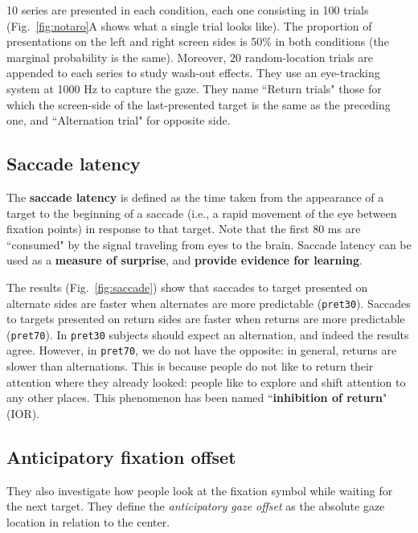 10 series are presented in each condition, each one consisting in 100 trials (Fig.~\ref{fig:notaro}A shows what a single trial looks like).
The proportion of presentations on the left and right screen sides is 50\% in both conditions (the marginal probability is the same).
Moreover, 20 random-location trials are appended to each series to study wash-out effects. They use an eye-tracking system at 1000 Hz to capture the gaze.
They name ``Return trials" those for which the screen-side of the last-presented target is the same as the preceding one, and ``Alternation trial" for opposite side.

\subsection{Saccade latency}
The \textbf{saccade latency} is defined as the time taken from the appearance of a target to the beginning of a saccade (i.e., a rapid movement of the eye between fixation points) in response to that target. Note that the first 80 ms are ``consumed" by the signal traveling from eyes to the brain. Saccade latency can be used as a \textbf{measure of surprise}, and \textbf{provide evidence for learning}.

The results (Fig.~\ref{fig:saccade}) show that saccades to target presented on alternate sides are faster when alternates are more predictable (\texttt{pret30}). Saccades to targets presented on return sides are faster when returns are more predictable (\texttt{pret70}). In \texttt{pret30} subjects should expect an alternation, and indeed the results agree. However, in \texttt{pret70}, we do not have the opposite: in general, returns are slower than alternations. This is because people do not like to return their attention where they already looked: people like to explore and shift attention to any other places. This phenomenon has been named ``\textbf{inhibition of return}" (IOR).

\subsection{Anticipatory fixation offset}
They also investigate how people look at the fixation symbol while waiting for the next target.
They define the \textit{anticipatory gaze offset} as the absolute gaze location in relation to the center.


